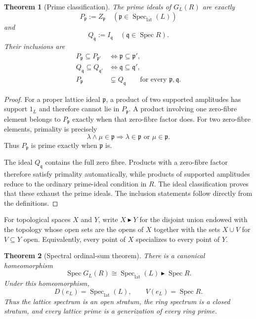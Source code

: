 \documentclass[11pt]{amsart}
\numberwithin{equation}{section}
\newtheorem{theorem}{Theorem}[section]
\theoremstyle{definition}
\newcommand{\Spec}{\operatorname{Spec}}
\newcommand{\SpecLat}{\operatorname{Spec}_{\mathrm{lat}}}
\begin{document}
\begin{theorem}[Prime classification]
\label{thm:lattice-prime-classification}
The prime ideals of $G_L(R)$ are exactly
\[
P_{\mathfrak p}:=Z_{\mathfrak p}
\quad(\mathfrak p\in\SpecLat(L))
\]
and
\[
Q_{\mathfrak q}:=I_{\mathfrak q}
\quad(\mathfrak q\in\Spec R).
\]
Their inclusions are
\begin{align*}
P_{\mathfrak p}\subseteq P_{\mathfrak p'}
&\iff \mathfrak p\subseteq\mathfrak p',\\
Q_{\mathfrak q}\subseteq Q_{\mathfrak q'}
&\iff \mathfrak q\subseteq\mathfrak q',\\
P_{\mathfrak p}&\subsetneq Q_{\mathfrak q}
\qquad\text{for every }\mathfrak p,\mathfrak q.
\end{align*}
\end{theorem}

\begin{proof}
For a proper lattice ideal $\mathfrak p$, a product of two supported
amplitudes has support $1_L$ and therefore cannot lie in
$P_{\mathfrak p}$.  A product involving one zero-fibre element belongs to
$P_{\mathfrak p}$ exactly when that zero-fibre factor does.  For two
zero-fibre elements, primality is precisely
\[
\lambda\wedge\mu\in\mathfrak p
\Longrightarrow
\lambda\in\mathfrak p\text{ or }\mu\in\mathfrak p.
\]
Thus $P_{\mathfrak p}$ is prime exactly when $\mathfrak p$ is.

The ideal $Q_{\mathfrak q}$ contains the full zero fibre.  Products with a
zero-fibre factor therefore satisfy primality automatically, while products
of supported amplitudes reduce to the ordinary prime-ideal condition in
$R$.  The ideal classification proves that these exhaust the prime ideals.
The inclusion statements follow directly from the definitions.
\end{proof}

For topological spaces $X$ and $Y$, write $X\blacktriangleright Y$ for the
disjoint union endowed with the topology whose open sets are the opens of
$X$ together with the sets $X\cup V$ for $V\subseteq Y$ open.  Equivalently,
every point of $X$ specializes to every point of $Y$.

\begin{theorem}[Spectral ordinal-sum theorem]
\label{thm:spectral-ordinal-sum}
There is a canonical homeomorphism
\[
\boxed{
\Spec G_L(R)
\cong
\SpecLat(L)\blacktriangleright\Spec R.
}
\]
Under this homeomorphism,
\[
D(e_L)=\SpecLat(L),
\qquad
V(e_L)=\Spec R.
\]
Thus the lattice spectrum is an open stratum, the ring spectrum is a closed
stratum, and every lattice prime is a generization of every ring prime.
\end{theorem}
\end{document}
